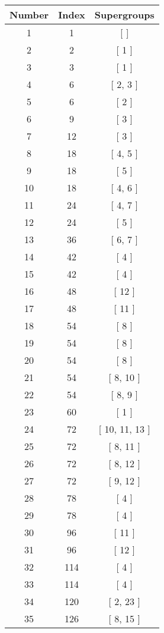 \begin{center}
\begin{longtable}[H]{|| c c c ||}
\hline
Number & Index & Supergroups \\ 
\hline
1 & 1 & [ ] \\ 
\hline
2 & 2 & [ 1 ] \\ 
\hline
3 & 3 & [ 1 ] \\ 
\hline
4 & 6 & [ 2, 3 ] \\ 
\hline
5 & 6 & [ 2 ] \\ 
\hline
6 & 9 & [ 3 ] \\ 
\hline
7 & 12 & [ 3 ] \\ 
\hline
8 & 18 & [ 4, 5 ] \\ 
\hline
9 & 18 & [ 5 ] \\ 
\hline
10 & 18 & [ 4, 6 ] \\ 
\hline
11 & 24 & [ 4, 7 ] \\ 
\hline
12 & 24 & [ 5 ] \\ 
\hline
13 & 36 & [ 6, 7 ] \\ 
\hline
14 & 42 & [ 4 ] \\ 
\hline
15 & 42 & [ 4 ] \\ 
\hline
16 & 48 & [ 12 ] \\ 
\hline
17 & 48 & [ 11 ] \\ 
\hline
18 & 54 & [ 8 ] \\ 
\hline
19 & 54 & [ 8 ] \\ 
\hline
20 & 54 & [ 8 ] \\ 
\hline
21 & 54 & [ 8, 10 ] \\ 
\hline
22 & 54 & [ 8, 9 ] \\ 
\hline
23 & 60 & [ 1 ] \\ 
\hline
24 & 72 & [ 10, 11, 13 ] \\ 
\hline
25 & 72 & [ 8, 11 ] \\ 
\hline
26 & 72 & [ 8, 12 ] \\ 
\hline
27 & 72 & [ 9, 12 ] \\ 
\hline
28 & 78 & [ 4 ] \\ 
\hline
29 & 78 & [ 4 ] \\ 
\hline
30 & 96 & [ 11 ] \\ 
\hline
31 & 96 & [ 12 ] \\ 
\hline
32 & 114 & [ 4 ] \\ 
\hline
33 & 114 & [ 4 ] \\ 
\hline
34 & 120 & [ 2, 23 ] \\ 
\hline
35 & 126 & [ 8, 15 ] \\ 
\hline

\end{longtable}
\end{center}

